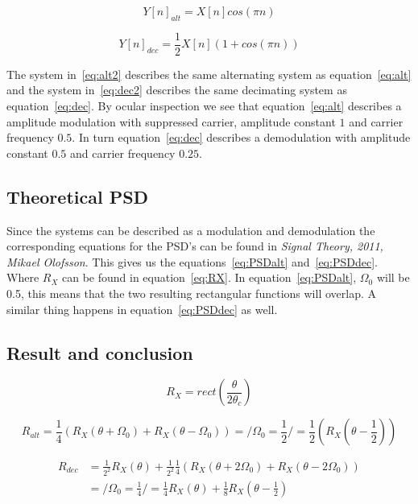 \documentclass[10pt]{article}
\begin{document}
\begin{equation}
  \label{eq:alt2}
  Y[n]_{alt} =X[n]cos(\pi n)
\end{equation}

\begin{equation}
  \label{eq:dec2}
  Y[n]_{dec} =\frac{1}{2}X[n](1+cos(\pi n))
\end{equation}

The system in~\ref{eq:alt2} describes the same alternating system as equation~\ref{eq:alt} and
the system in~\ref{eq:dec2} describes the same decimating system as equation~\ref{eq:dec}.
By ocular inspection we see that equation~\ref{eq:alt} describes a amplitude modulation with
suppressed carrier, amplitude constant $1$ and carrier frequency $0.5$. In turn equation~\ref{eq:dec}
describes a demodulation with amplitude constant $0.5$ and carrier frequency $0.25$.

\subsection{Theoretical PSD}

Since the systems can be described as a modulation and demodulation the corresponding equations
for the PSD's can be found in \emph{Signal Theory, 2011, Mikael Olofsson}. This gives us the
equations~\ref{eq:PSDalt} and~\ref{eq:PSDdec}. Where $R_X$ can be found in equation~\ref{eq:RX}.
In equation~\ref{eq:PSDalt}, $\Omega_0$ will be 0.5, this means that the two
resulting rectangular functions will overlap. A similar thing happens in
equation~\ref{eq:PSDdec} as well.

\subsection{Result and conclusion}

\begin{equation}
  \label{eq:RX}
  R_{X} = rect(\frac{\theta}{2\theta_c} )
\end{equation}

\begin{equation}
  \label{eq:PSDalt}
  R_{alt} = \frac{1}{4}(R_X(\theta+\Omega_0) + R_X(\theta-\Omega_0)) = \Bigg/ \Omega_0 = \frac{1}{2} \Bigg/ = \frac{1}{2}(R_X(\theta-\frac{1}{2}))
\end{equation}

\begin{align}
  \label{eq:PSDdec}
  R_{dec} & = \frac{1}{2^2}R_X(\theta) + \frac{1}{2^2}\frac{1}{4}(R_X(\theta+2\Omega_0)
  + R_X(\theta-2\Omega_0)) \\
   & = \Bigg/ \Omega_0  = \frac{1}{4} \Bigg/ = \nonumber
   \frac{1}{4}R_X(\theta) + \frac{1}{8}R_X(\theta-\frac{1}{2})
\end{align}
\end{document}
